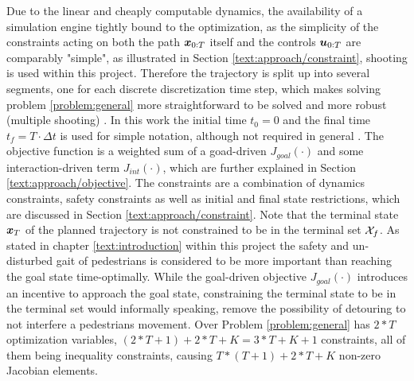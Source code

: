 Due to the linear and cheaply computable dynamics, the availability of a simulation engine tightly bound to the optimization, as the simplicity of the constraints acting on both the path $\boldsymbol{x}_{0:T}$ itself and the controls $\boldsymbol{u}_{0:T}$ are comparably "simple", as illustrated in Section \ref{text:approach/constraint}, shooting is used within this project. Therefore the trajectory is split up into several segments, one for each discrete discretization time step, which makes solving problem \ref{problem:general} more straightforward  to be solved and more robust (multiple shooting) \cite{Betts1998}. In this work the initial time $t_0 = 0$ and the final time $t_f = T \cdot \Delta t$ is used for simple notation, although not required in general \cite{Wachter2006}.
\newline
The objective function is a weighted sum of a goad-driven $J_{goal}(\cdot)$ and some interaction-driven term $J_{int}(\cdot)$, which are further explained in Section \ref{text:approach/objective}. The constraints are a combination of dynamics constraints, safety constraints as well as initial and final state restrictions, which are discussed in Section \ref{text:approach/constraint}. Note that the terminal state $\boldsymbol{x}_T$ of the planned trajectory is not constrained to be in the terminal set $\mathcal{X}_f$. As stated in chapter \ref{text:introduction} within this project the safety and un-disturbed gait of pedestrians is considered to be more important than reaching the goal state time-optimally. While the goal-driven objective $J_{goal}(\cdot)$ introduces an incentive to approach the goal state, constraining the terminal state to be in the terminal set would informally speaking, remove the possibility of detouring to not interfere a pedestrians movement.
\newline
Over Problem \ref{problem:general} has $2*T$ optimization variables, $(2*T + 1) + 2*T + K = 3*T + K + 1$ constraints, all of them being inequality constraints, causing $T * (T+1) + 2*T + K$ non-zero Jacobian elements.

